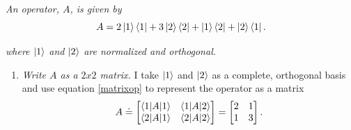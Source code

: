 \begin{example}
	\emph{An operator, $A$, is given by}
	\begin{equation}
		A=2\ket{1}\bra{1}+3\ket{2}\bra{2}+\ket{1}\bra{2}+\ket{2}\bra{1}.
	\end{equation} 
	
	\emph{where $\ket{1}$ and $\ket{2}$ are normalized and orthogonal.}\newline
	\begin{enumerate}
		\item \emph{Write $A$ as a $2x2$ matrix.}\newline
		I take $\ket{1}$ and $\ket{2}$ as a complete, orthogonal basis and use equation \eqref{matrixop} to represent the operator as a matrix
		\begin{equation}
			A\doteq \begin{bmatrix}
				\braket{1|A|1} & \braket{1|A|2}\\
				\braket{2|A|1} & \braket{2|A|2} \\
			\end{bmatrix}=
			\begin{bmatrix}
				2 & 1\\
				1 & 3 \\
			\end{bmatrix}.
		\end{equation} 
		

\end{enumerate}
\end{example}
